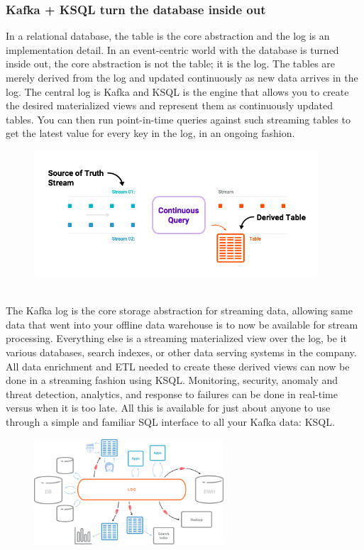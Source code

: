 \documentclass[10pt,a4paper]{article}
\begin{document}
\subsubsection{Kafka + KSQL turn the database inside out} 
 In a relational database, the table is the core abstraction and the log is an implementation detail. In an event-centric world with the database is turned inside out, the core abstraction is not the table; it is the log. The tables are merely derived from the log and updated continuously as new data arrives in the log. The central log is Kafka and KSQL is the engine that allows you to create the desired materialized views and represent them as continuously updated tables. You can then run point-in-time queries against such streaming tables to get the latest value for every key in the log, in an ongoing fashion.
  \begin{figure}[ht!]
 \hfill \includegraphics[width=300pt]{images/ksql-query-ex}\hspace*{\fill}
 \end{figure} \\
The Kafka log is the core storage abstraction for streaming data, allowing same data that went into your offline data warehouse is to now be available for stream processing. Everything else is a streaming materialized view over the log, be it various databases, search indexes, or other data serving systems in the company. All data enrichment and ETL needed to create these derived views can now be done in a streaming fashion using KSQL. Monitoring, security, anomaly and threat detection, analytics, and response to failures can be done in real-time versus when it is too late. All this is available for just about anyone to use through a simple and familiar SQL interface to all your Kafka data: KSQL.
  \begin{figure}[ht!]
 \hfill \includegraphics[width=200pt]{images/kafka-ksql}\hspace*{\fill}
 \end{figure} 
\end{document}
